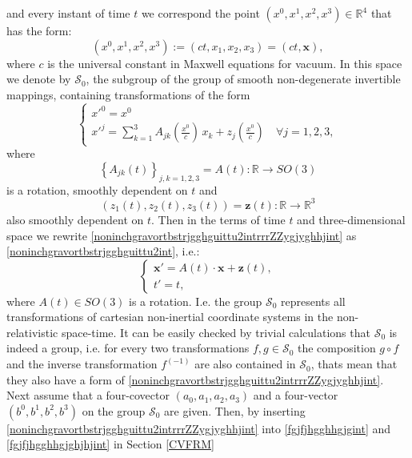 \documentclass{article}
\theoremstyle{definition}
\theoremstyle{remark}
\renewcommand{\vec}[1]{\mathbf{#1}}
\newcommand{\er}{\eqref}
\newcommand{\er}{\eqref}
\begin{document}
and every instant of time $t$ we correspond the point
$(x^0,x^1,x^2,x^3)\in\mathbb{R}^4$ that has the form:
\begin{equation}\label{fgjfjhgghint}
(x^0,x^1,x^2,x^3):=(ct,x_1,x_2,x_3)=\left(ct,\vec x\right),
\end{equation}
where $c$ is the universal constant in Maxwell equations for vacuum.
In this space we denote by $\mathcal{S}_0$, the subgroup of the
group of smooth non-degenerate invertible mappings, containing
transformations of the form
\begin{equation}\label{noninchgravortbstrjgghguittu2intrrrZZygjyghhjint}
\begin{cases}
x'^0=x^0
\\
x'^j=\sum\limits_{k=1}^{3}A_{jk}\left(\frac{x^0}{c}\right)\,x_k+z_j\left(\frac{x^0}{c}\right)\quad\forall
j=1,2,3,
\end{cases}
\end{equation}
where $$\left\{A_{jk}(t)\right\}_{j,k=1,2,3}=A(t):\mathbb{R}\to
SO(3)$$ is a rotation, smoothly dependent on $t$ and
$$\left(z_1(t),z_2(t),z_3(t)\right)=\vec
z(t):\mathbb{R}\to\mathbb{R}^3$$ also smoothly dependent on $t$.
Then in the terms of time $t$ and three-dimensional space we rewrite
\er{noninchgravortbstrjgghguittu2intrrrZZygjyghhjint} as
\er{noninchgravortbstrjgghguittu2int}, i.e.:
\begin{equation}\label{noninchgravortbstrjgghguittu2intrrrZZygjygint}
\begin{cases}
\vec x'=A(t)\cdot\vec x+\vec z(t),\\
t'=t,
\end{cases}
\end{equation}
where $A(t)\in SO(3)$ is a rotation. I.e. the group $\mathcal{S}_0$
represents all transformations of cartesian non-inertial coordinate
systems in the non-relativistic space-time. It can be easily checked
by trivial calculations that $\mathcal{S}_0$ is indeed a group, i.e.
for every two transformations $f,g\in\mathcal{S}_0$ the composition
$g\circ f$ and the inverse transformation $f^{(-1)}$ are also
contained in $\mathcal{S}_0$, thats mean that they also have a form
of \er{noninchgravortbstrjgghguittu2intrrrZZygjyghhjint}. Next
assume that a four-covector $(a_0,a_1,a_2,a_3)$ and a four-vector
$(b^0,b^1,b^2,b^3)$ on the group $\mathcal{S}_0$ are given. Then, by
inserting \er{noninchgravortbstrjgghguittu2intrrrZZygjyghhjint} into
\er{fgjfjhgghhgjgint} and \er{fgjfjhgghhgjghjhjint} in Section
\ref{CVFRM}
%
%
%
\end{document}
